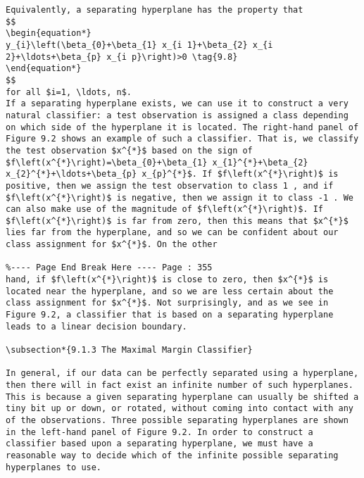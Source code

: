 \documentclass[10pt]{article}
\begin{document}
\begin{verbatim}
Equivalently, a separating hyperplane has the property that
$$
\begin{equation*}
y_{i}\left(\beta_{0}+\beta_{1} x_{i 1}+\beta_{2} x_{i 2}+\ldots+\beta_{p} x_{i p}\right)>0 \tag{9.8}
\end{equation*}
$$
for all $i=1, \ldots, n$.
If a separating hyperplane exists, we can use it to construct a very natural classifier: a test observation is assigned a class depending on which side of the hyperplane it is located. The right-hand panel of Figure 9.2 shows an example of such a classifier. That is, we classify the test observation $x^{*}$ based on the sign of $f\left(x^{*}\right)=\beta_{0}+\beta_{1} x_{1}^{*}+\beta_{2} x_{2}^{*}+\ldots+\beta_{p} x_{p}^{*}$. If $f\left(x^{*}\right)$ is positive, then we assign the test observation to class 1 , and if $f\left(x^{*}\right)$ is negative, then we assign it to class -1 . We can also make use of the magnitude of $f\left(x^{*}\right)$. If $f\left(x^{*}\right)$ is far from zero, then this means that $x^{*}$ lies far from the hyperplane, and so we can be confident about our class assignment for $x^{*}$. On the other

%---- Page End Break Here ---- Page : 355
hand, if $f\left(x^{*}\right)$ is close to zero, then $x^{*}$ is located near the hyperplane, and so we are less certain about the class assignment for $x^{*}$. Not surprisingly, and as we see in Figure 9.2, a classifier that is based on a separating hyperplane leads to a linear decision boundary.

\subsection*{9.1.3 The Maximal Margin Classifier}

In general, if our data can be perfectly separated using a hyperplane, then there will in fact exist an infinite number of such hyperplanes. This is because a given separating hyperplane can usually be shifted a tiny bit up or down, or rotated, without coming into contact with any of the observations. Three possible separating hyperplanes are shown in the left-hand panel of Figure 9.2. In order to construct a classifier based upon a separating hyperplane, we must have a reasonable way to decide which of the infinite possible separating hyperplanes to use.


\end{verbatim}
\end{document}
